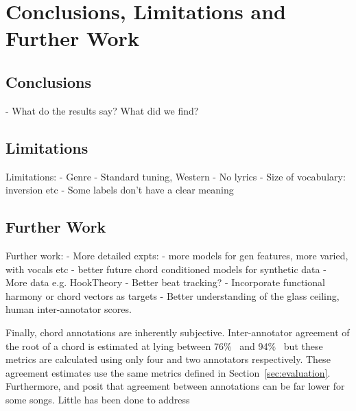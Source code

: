 
\chapter{Conclusions, Limitations and Further Work}

\section{Conclusions}

- What do the results say? What did we find?

\section{Limitations}
Limitations:
- Genre
- Standard tuning, Western
- No lyrics
- Size of vocabulary: inversion etc
- Some labels don't have a clear meaning

\section{Further Work}
Further work:
- More detailed expts:
    - more models for gen features, more varied, with vocals etc
    - better future chord conditioned models for synthetic data
- More data e.g. HookTheory
- Better beat tracking?
- Incorporate functional harmony or chord vectors as targets
- Better understanding of the glass ceiling, human inter-annotator scores.

Finally, chord annotations are inherently subjective. Inter-annotator agreement of the root of a chord is estimated at lying between 76\%~\citep{AnnotatorAgreement76} and 94\%~\citep{RockHarmonyAnalysis94} but these metrics are calculated using only four and two annotators respectively. These agreement estimates use the same metrics defined in Section~\ref{sec:evaluation}. Furthermore, \citet{FourTimelyInsights} and \citet{UnderstandingSubjectivity} posit that agreement between annotations can be far lower for some songs. Little has been done to address